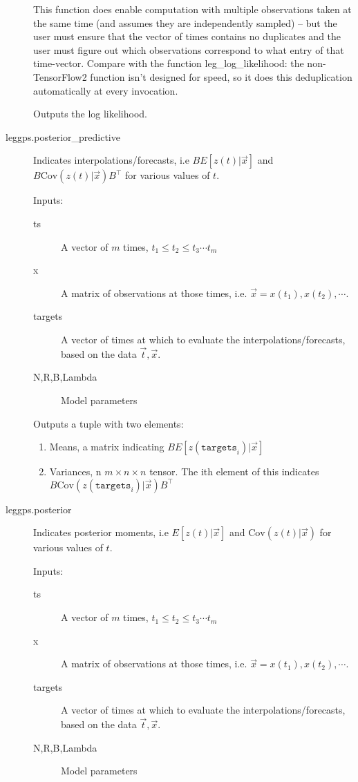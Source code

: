 \documentclass{article}
\theoremstyle{definition}
\newcommand{\Cov}{\mathrm{Cov}}
\begin{document}
\begin{description}
    This function does enable computation with multiple observations taken at the same time (and assumes they are independently sampled) -- but the user must ensure that the vector of times contains no duplicates and the user must figure out which observations correspond to what entry of that time-vector.  Compare with the function leg\_log\_likelihood: the non-TensorFlow2 function isn't designed for speed, so it does this deduplication automatically at every invocation.

    Outputs the log likelihood.

    \item[leggps.posterior\_predictive] Indicates interpolations/forecasts, i.e $BE[z(t)|\vec x]$ and $B\Cov(z(t)|\vec x)B^\top$ for various values of $t$.

        Inputs:
        \begin{description}
            \item[ts] A vector of $m$ times, $t_1 \leq t_2 \leq t_3 \cdots t_m$
            \item[x] A matrix of observations at those times, i.e. $\vec x = x(t_1),x(t_2),\cdots$.  
            \item[targets] A vector of times at which to evaluate the interpolations/forecasts, based on the data $\vec t,\vec x$.
            \item[N,R,B,Lambda] Model parameters
        \end{description}   

        Outputs a tuple with two elements:
        \begin{enumerate}
            \item Means, a matrix indicating $BE[z(\mathtt{targets}_i)|\vec x]$
            \item Variances, n $m \times n \times n$ tensor.  The ith element of this indicates $B\Cov(z(\mathtt{targets}_i)|\vec x)B^\top$
        \end{enumerate}

    \item[leggps.posterior] Indicates posterior moments, i.e $E[z(t)|\vec x]$ and $\Cov(z(t)|\vec x)$ for various values of $t$.

        Inputs:
        \begin{description}
            \item[ts] A vector of $m$ times, $t_1 \leq t_2 \leq t_3 \cdots t_m$
            \item[x] A matrix of observations at those times, i.e. $\vec x = x(t_1),x(t_2),\cdots$.  
            \item[targets] A vector of times at which to evaluate the interpolations/forecasts, based on the data $\vec t,\vec x$.
            \item[N,R,B,Lambda] Model parameters
        \end{description}   


\end{description}
\end{document}
